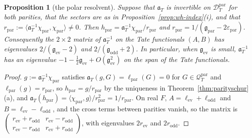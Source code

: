 \documentclass[11pt]{amsart}
\newtheorem{proposition}[theorem]{Proposition}
\theoremstyle{definition}
\theoremstyle{remark}
\begin{document}
\begin{proposition}[the polar resolvent]\label{prop:wh-polarres}
Suppose that $\mathfrak a_T$ is invertible on $\mathcal D^{\mathrm{par}}_T$ for both parities, that the sectors are as in
Proposition~\ref{prop:wh-index}(i), and that $r_{\mathrm{par}}:=\langle\mathfrak a_T^{-1}\chi_{\mathrm{par}},\chi_{\mathrm{par}}\rangle\ne0$. Then
$h_{\mathrm{par}}=\mathfrak a_T^{-1}\chi_{\mathrm{par}}/r_{\mathrm{par}}$ and $r_{\mathrm{par}}=1/(\mathfrak g_{\mathrm{par}}-2\varepsilon_{\mathrm{par}})$. Consequently the
$2\times2$ matrix of $\mathfrak a_T^{-1}$ on the Tate functionals $(A,B)$ has eigenvalues
$2/(\mathfrak g_{\mathrm{ev}}-2)$ and $2/(\mathfrak g_{\mathrm{odd}}+2)$. In particular, when $\mathfrak g_{\mathrm{ev}}$ is small, $\mathfrak a_T^{-1}$ has an
eigenvalue $-1-\frac12\mathfrak g_{\mathrm{ev}}+O(\mathfrak g_{\mathrm{ev}}^2)$ on the span of the Tate functionals.
\end{proposition}

\begin{proof}
$g:=\mathfrak a_T^{-1}\chi_{\mathrm{par}}$ satisfies $\mathfrak a_T(g,G)=\ell_{\mathrm{par}}(G)=0$ for $G\in\mathcal Q^{\mathrm{par}}_T$ and $\ell_{\mathrm{par}}(g)=r_{\mathrm{par}}$, so
$h_{\mathrm{par}}=g/r_{\mathrm{par}}$ by the uniqueness in Theorem~\ref{thm:parityschur}(a), and
$\mathfrak a_T(h_{\mathrm{par}})=\langle\chi_{\mathrm{par}},g\rangle/r_{\mathrm{par}}^2=1/r_{\mathrm{par}}$. On real $F$, $A=\ell_{\mathrm{ev}}+\ell_{\mathrm{odd}}$ and
$B=\ell_{\mathrm{ev}}-\ell_{\mathrm{odd}}$, and the cross terms between parities vanish, so the matrix is
$\begin{pmatrix}r_{\mathrm{ev}}+r_{\mathrm{odd}}&r_{\mathrm{ev}}-r_{\mathrm{odd}}\\ r_{\mathrm{ev}}-r_{\mathrm{odd}}&r_{\mathrm{ev}}+r_{\mathrm{odd}}\end{pmatrix}$, with eigenvalues
$2r_{\mathrm{ev}}$ and $2r_{\mathrm{odd}}$.
\end{proof}
\end{document}
